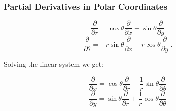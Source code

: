 \begin{frame}
  \frametitle{Partial Derivatives in Polar Coordinates}
%
$$\frac{\partial}{\partial r} = \cos\theta\frac{\partial }{\partial x}  + \sin\theta\frac{\partial }{\partial y} $$
%
$$  \frac{\partial}{\partial \theta} =  - r \sin\theta\frac{\partial }{\partial x}  + r \cos\theta\frac{\partial }{\partial y} \; .$$

\pause
Solving the linear system we get:

$$
  \frac{\partial}{\partial x} = \cos\theta\frac{\partial }{\partial r}  - \frac{1}{r} \sin\theta\frac{\partial }{\partial \theta} $$
%
$$\frac{\partial}{\partial y} = \sin\theta\frac{\partial }{\partial r}  + \frac{1}{r} \cos\theta\frac{\partial }{\partial \theta}
$$
\end{frame}